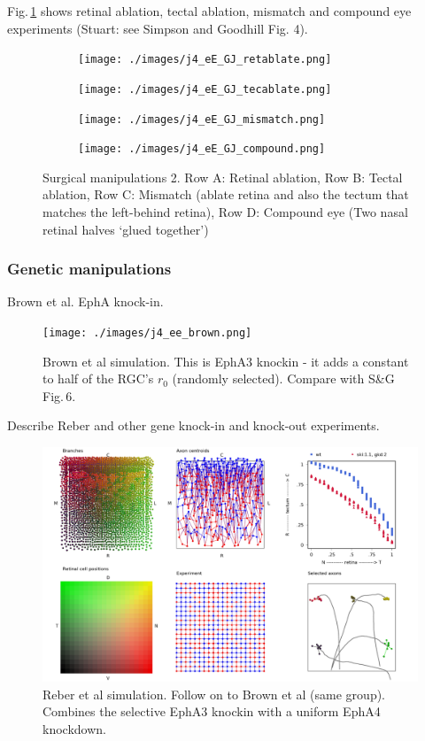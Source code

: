 \documentclass[11pt, a4paper]{article}
\begin{document}
Fig.\,\ref{f:surg2} shows retinal ablation, tectal ablation, mismatch and
compound eye experiments (Stuart: see Simpson and Goodhill Fig. 4).

\begin{figure}
\begin{subfigure}{\linewidth}
\texttt{[image: ./images/j4\_eE\_GJ\_retablate.png]}
\end{subfigure}
\begin{subfigure}{\linewidth}
\texttt{[image: ./images/j4\_eE\_GJ\_tecablate.png]}
\end{subfigure}
\begin{subfigure}{\linewidth}
\texttt{[image: ./images/j4\_eE\_GJ\_mismatch.png]}
\end{subfigure}
\begin{subfigure}{\linewidth}
\texttt{[image: ./images/j4\_eE\_GJ\_compound.png]}
\end{subfigure}
\caption{Surgical manipulations 2. Row A: Retinal ablation, Row B: Tectal
ablation, Row C: Mismatch (ablate retina and also the tectum that matches the
left-behind retina), Row D: Compound eye (Two nasal retinal halves `glued
together')}
\label{f:surg2}
\end{figure}

\subsubsection*{Genetic manipulations}

Brown et al. EphA knock-in.

\begin{figure}
\texttt{[image: ./images/j4\_ee\_brown.png]}
\caption{Brown et al simulation. This is EphA3 knockin - it adds a constant to
half of the RGC's $r_0$ (randomly selected). Compare with S\&G Fig.\,6.}
\label{f:brown}
\end{figure}

Describe Reber and other gene knock-in and knock-out experiments.

\begin{figure}
\includegraphics[width=\linewidth]{./images/j4_ee_reber.png}
\caption{Reber et al simulation. Follow on to Brown et al (same
group). Combines the selective EphA3 knockin with a uniform EphA4 knockdown.}
\label{f:reber}
\end{figure}
\end{document}
